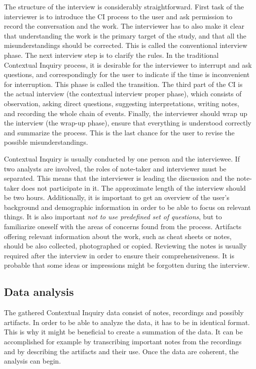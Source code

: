 \documentclass[12pt,a4paper,oneside,pdftex]{report}
\begin{document}
The structure of the interview is considerably straightforward. First task of the interviewer is to introduce the CI process to the user and ask permission to record the conversation and the work. The interviewer has to also make it clear that understanding the work is the primary target of the study, and that all the misunderstandings should be corrected. This is called the conventional interview phase. The next interview step is to clarify the rules. In the traditional Contextual Inquiry process, it is desirable for the interviewer to interrupt and ask questions, and correspondingly for the user to indicate if the time is inconvenient for interruption. This phase is called the transition. The third part of the CI is the actual interview (the contextual interview proper phase), which consists of observation, asking direct questions, suggesting interpretations, writing notes, and recording the whole chain of events. Finally, the interviewer should wrap up the interview (the wrap-up phase), ensure that everything is understood correctly and summarize the process. This is the last chance for the user to revise the possible misunderstandings. \citep{RefWorks:21}

Contextual Inquiry is usually conducted by one person and the interviewee. If two analysts are involved, the roles of note-taker and interviewer must be separated. This means that the interviewer is leading the discussion and the note-taker does not participate in it. The approximate length of the interview should be two hours. Additionally, it is important to get an overview of the user's background and demographic information in order to be able to focus on relevant things. It is also important \emph{not to use predefined set of questions}, but to familiarize oneself with the areas of concerns found from the process. Artifacts offering relevant information about the work, such as cheat sheets or notes, should be also collected, photographed or copied. \citep{RefWorks:27} Reviewing the notes is usually required after the interview in order to ensure their comprehensiveness. It is probable that some ideas or impressions might be forgotten during the interview. \citep{RefWorks:28}


\subsection{Data analysis}

The gathered Contextual Inquiry data consist of notes, recordings and possibly artifacts. In order to be able to analyze the data, it has to be in identical format. This is why it might be beneficial to create a summation of the data. It can be accomplished for example by transcribing important notes from the recordings and by describing the artifacts and their use. Once the data are coherent, the analysis can begin. 
\end{document}

